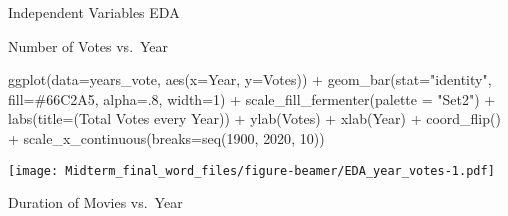 \documentclass[
  ignorenonframetext,
]{beamer}
\newenvironment{Shaded}{\begin{snugshade}}{\end{snugshade}}
\newcommand{\AttributeTok}[1]{\textcolor[rgb]{0.77,0.63,0.00}{#1}}
\newcommand{\CommentTok}[1]{\textcolor[rgb]{0.56,0.35,0.01}{\textit{#1}}}
\newcommand{\DecValTok}[1]{\textcolor[rgb]{0.00,0.00,0.81}{#1}}
\newcommand{\FunctionTok}[1]{\textcolor[rgb]{0.00,0.00,0.00}{#1}}
\newcommand{\NormalTok}[1]{#1}
\newcommand{\OtherTok}[1]{\textcolor[rgb]{0.56,0.35,0.01}{#1}}
\newcommand{\SpecialCharTok}[1]{\textcolor[rgb]{0.00,0.00,0.00}{#1}}
\newcommand{\StringTok}[1]{\textcolor[rgb]{0.31,0.60,0.02}{#1}}
\begin{document}
\begin{frame}[fragile]{Independent Variables EDA}
\begin{block}{Number of Votes vs.~Year}
\begin{Shaded}
\begin{Highlighting}[]
\FunctionTok{ggplot}\NormalTok{(}\AttributeTok{data=}\NormalTok{years\_vote, }\FunctionTok{aes}\NormalTok{(}\AttributeTok{x=}\NormalTok{Year, }\AttributeTok{y=}\NormalTok{Votes)) }\SpecialCharTok{+}
  \FunctionTok{geom\_bar}\NormalTok{(}\AttributeTok{stat=}\StringTok{"identity"}\NormalTok{, }\AttributeTok{fill=}\StringTok{\textquotesingle{}\#66C2A5\textquotesingle{}}\NormalTok{, }\AttributeTok{alpha=}\NormalTok{.}\DecValTok{8}\NormalTok{, }\AttributeTok{width=}\DecValTok{1}\NormalTok{) }\SpecialCharTok{+}
    \FunctionTok{scale\_fill\_fermenter}\NormalTok{(}\AttributeTok{palette =} \StringTok{"Set2"}\NormalTok{) }\SpecialCharTok{+} 
      \FunctionTok{labs}\NormalTok{(}\AttributeTok{title=}\NormalTok{(}\StringTok{\textquotesingle{}Total Votes every Year\textquotesingle{}}\NormalTok{)) }\SpecialCharTok{+} 
        \FunctionTok{ylab}\NormalTok{(}\StringTok{\textquotesingle{}Votes\textquotesingle{}}\NormalTok{) }\SpecialCharTok{+}
          \FunctionTok{xlab}\NormalTok{(}\StringTok{\textquotesingle{}Year\textquotesingle{}}\NormalTok{) }\SpecialCharTok{+}
            \FunctionTok{coord\_flip}\NormalTok{() }\SpecialCharTok{+}
              \FunctionTok{scale\_x\_continuous}\NormalTok{(}\AttributeTok{breaks=}\FunctionTok{seq}\NormalTok{(}\DecValTok{1900}\NormalTok{, }\DecValTok{2020}\NormalTok{, }\DecValTok{10}\NormalTok{))}
\end{Highlighting}
\end{Shaded}

\texttt{[image: Midterm\_final\_word\_files/figure-beamer/EDA\_year\_votes-1.pdf]}
\end{block}

\begin{block}{Duration of Movies vs.~Year}
\protect\hypertarget{duration-of-movies-vs.-year}{}
\begin{Shaded}
\end{Shaded}


\end{block}
\end{frame}
\end{document}
